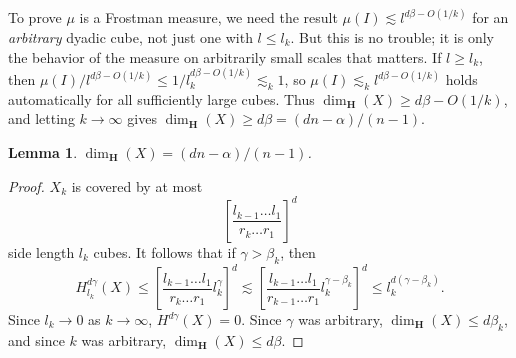 \documentclass[usenames,dvipsnames]{article}
\theoremstyle{plain}
\newtheorem{lemma}{Lemma}
\theoremstyle{plain}
\begin{document}
To prove $\mu$ is a Frostman measure, we need the result $\mu(I) \lesssim l^{d \beta - O(1/k)}$ for an {\it arbitrary} dyadic cube, not just one with $l \leq l_k$. But this is no trouble; it is only the behavior of the measure on arbitrarily small scales that matters. If $l \geq l_k$, then $\mu(I)/l^{d \beta - O(1/k)} \leq 1/l_k^{d \beta - O(1/k)} \lesssim_k 1$, so $\mu(I) \lesssim_k l^{d \beta - O(1/k)}$ holds automatically for all sufficiently large cubes. Thus $\dim_{\mathbf{H}}(X) \geq d \beta - O(1/k)$, and letting $k \to \infty$ gives $\dim_{\mathbf{H}}(X) \geq d \beta = (dn - \alpha)/(n-1)$.

\begin{lemma}
	$\dim_{\mathbf{H}}(X) = (dn - \alpha)/(n-1)$.
\end{lemma}
\begin{proof}
	$X_k$ is covered by at most
	\[ \left[ \frac{l_{k-1} \dots l_1}{r_k \dots r_1} \right]^d \]
	side length $l_k$ cubes. It follows that if $\gamma > \beta_k$, then
	\[ H^{d\gamma}_{l_k}(X) \leq \left[ \frac{l_{k-1} \dots l_1}{r_k \dots r_1} l_k^\gamma \right]^d \lesssim \left[ \frac{l_{k-1} \dots l_1}{r_{k-1} \dots r_1} l_k^{\gamma - \beta_k} \right]^d \leq l_k^{d(\gamma - \beta_k)}. \]
	Since $l_k \to 0$ as $k \to \infty$, $H^{d \gamma}(X) = 0$. Since $\gamma$ was arbitrary, $\dim_{\mathbf{H}}(X) \leq d \beta_k$, and since $k$ was arbitrary, $\dim_{\mathbf{H}}(X) \leq d \beta$.
\end{proof}


\end{document}
